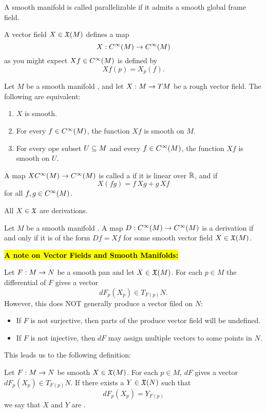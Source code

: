 \dfn A smooth manifold is called parallelizable if it admits a smooth global frame field.

\nb A vector field $X\in \mathfrak{X}(M)$ defines a map
\[X:C^\infty(M)\rightarrow C^\infty(M)\]
as you might expect $Xf\in C^\infty(M)$ is defined by
\[Xf(p) = X_p(f).\]

\setcounter{thm}{13}

\begin{prop}
Let $M$ be a smooth manifold \wowob, and let $X:M\rightarrow TM$ be a rough vector field. The following are equivalent:
\begin{enumerate}
    \item $X$ is smooth.
    \item For every $f\in C^\infty(M)$, the function $Xf$ is smooth on $M$.
    \item For every ope subset $U\subseteq M$ and every $f\in C^\infty(M)$, the function $Xf$ is smooth on $U$.
\end{enumerate}
\end{prop}

\dfn A map $XC^\infty(M)\rightarrow C^\infty(M)$ is called a  if it is linear over $\mathbb{R}$, and if 
\[X(fg) = f\,Xg + g\,Xf\]
for all $f,g\in C^\infty(M)$.

\nb All $X\in \mathfrak{X}$ are derivations.

\begin{prop}
Let $M$ be a smooth manifold \wowob. A map $D:C^\infty(M)\rightarrow C^\infty(M)$ is a derivation if and only if it is of the form $Df = Xf$ for some smooth vector field $X\in \mathfrak{X}(M)$.
\end{prop}


\vs\hl{\textbf{A note on Vector Fields and Smooth Manifolds:}}

Let $F:M\rightarrow N$ be a smooth pan and let $X\in \mathfrak{X}(M)$. For each $p\in M$ the differential of $F$ gives a vector
\[dF_p(X_p)\in T_{F(p)}N.\]
However, this does NOT generally produce a vector filed on $N$:
\begin{itemize}
    \item If $F$ is not surjective, then parts of the produce vector field will be undefined.
    \item If $F$ is not injective, then $dF$ may assign multiple vectors to some points in $N$.
\end{itemize}
This leads us to the following definition:

\dfn Let $F:M\rightarrow N$ be smooth $X\in \mathfrak{X}(M)$. For each $p\in M$, $dF$ gives a vector $dF_p(X_p)\in T_{F(p)}N$. If there exists a $Y\in \mathfrak{X}(N)$ such that 
\[dF_p(X_p) = Y_{F(p)}\]
we say that $X$ and $Y$ are .

